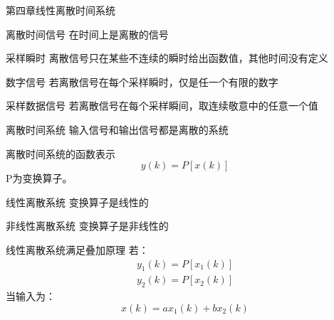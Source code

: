  \begin{frame}{第四章线性离散时间系统} 
 \begin{block}{离散时间信号}
 在时间上是离散的信号
 \end{block}
 \begin{block}{采样瞬时}
 离散信号只在某些不连续的瞬时给出函数值，其他时间没有定义
 \end{block}
 \begin{block}{数字信号}
 若离散信号在每个采样瞬时，仅是任一个有限的数字
 \end{block}
 \end{frame}
 
 \begin{frame}
 \begin{block}{采样数据信号}
 若离散信号在每个采样瞬间，取连续敬意中的任意一个值
 \end{block}
 \begin{block}{离散时间系统}
输入信号和输出信号都是离散的系统
 \end{block}
 \begin{block}{离散时间系统的函数表示} 
 \[y(k)=P[x(k)]\]
 P为变换算子。
 \end{block}
 \end{frame}

\begin{frame}{}
\begin{block}{线性离散系统}
变换算子是线性的
\end{block}
\begin{block}{非线性离散系统}
变换算子是非线性的
\end{block}
\end{frame}

\begin{frame}
\begin{block}{线性离散系统满足叠加原理}
若：
\begin{eqnarray*}
y_1(k)=P[x_1(k)]\\
y_2(k)=P[x_2(k)]
\end{eqnarray*}
当输入为：
\[x(k)=ax_1(k)+bx_2(k)\]
\end{block}
\end{frame}


